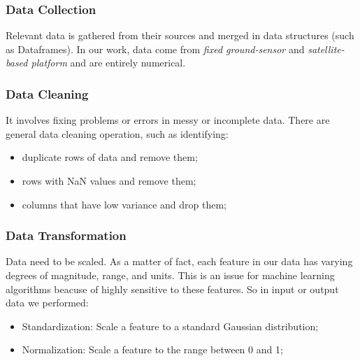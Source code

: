 \subsubsection{Data Collection}
Relevant data is gathered from their sources and merged in data structures (such as Dataframes). In our work, data come from \textit{fixed ground-sensor} and \textit{satellite-based platform} and are entirely numerical.
\subsubsection{Data Cleaning}
It involves fixing problems or errors in messy or incomplete data. There are general data cleaning operation, such as identifying:
\begin{itemize}
\item duplicate rows of data and remove them;
\item rows with NaN values and remove them;
\item columns that have low variance and drop them;
\end{itemize}
\subsubsection{Data Transformation}
Data need to be scaled. As a matter of fact, each feature in our data has varying degrees of magnitude, range, and units. This is an issue for machine learning algorithms beacuse of highly sensitive to these features. So in input or output data we performed:
\begin{itemize}
\item Standardization: Scale a feature to a standard Gaussian distribution;
\item Normalization: Scale a feature to the range between 0 and 1;
\end{itemize}
